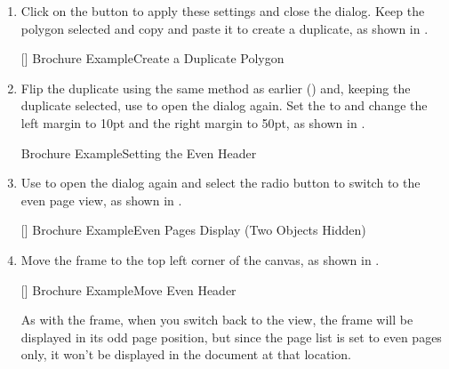 \begin{enumerate}
{
 {fig:brochure20a}{}{},
 {fig:brochure20b}{}{}
}
[Brochure Example\dash Setting The Odd Header]
{Brochure Example\dash Setting the odd header:
 entering the frame contents;
 the frame settings.}

\item Click on the  button to apply these settings and close the
dialog. Keep the polygon selected and copy and paste it to create a
duplicate, as shown in .

[]
{}
{Brochure Example\dash Create a Duplicate Polygon}

\item Flip the duplicate using the same method as earlier
() and, keeping the duplicate
selected, use  to open the
 dialog again. Set the
 to  and change the
left margin to 10\gls{pt} and the right margin to 50\gls*{pt}, as
shown in .

{}
{Brochure Example\dash Setting the Even Header}

\item Use  to open the
 dialog again and select the
 radio button to switch to the even
page view, as shown in .

[]
{}
{Brochure Example\dash Even Pages Display (Two Objects Hidden)}

\item Move the  frame to the top left corner of the
\gls{canvas}, as shown in .

[]
{}
{Brochure Example\dash Move Even Header}

As with the  frame, when you switch back to the
 view, the frame will be displayed in its odd page
position, but since the page list is set to even pages only, it
won't be displayed in the document at that location.


\end{enumerate}
